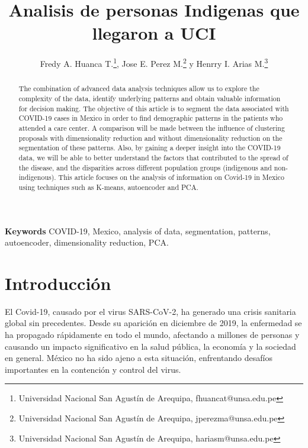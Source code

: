 \documentclass[a4paper,
               ]{jacow}
\newenvironment{keywords}
{\par\small\textbf{Keywords}}
{\par}
\begin{document}
\title{Analisis de personas Indigenas que llegaron a UCI}

\author{Fredy A. Huanca T.\thanks{Universidad Nacional San Agustín de Arequipa, fhuancat@unsa.edu.pe},
		Jose E. Perez M.\thanks{Universidad Nacional San Agustín de Arequipa, jperezma@unsa.edu.pe} y
		Henrry I. Arias M.\thanks{Universidad Nacional San Agustín de Arequipa, hariasm@unsa.edu.pe}}
	
\maketitle

%
\begin{abstract}
The combination of advanced data analysis techniques allow us to explore the complexity of the data, identify underlying patterns and obtain valuable information for decision making.
The objective of this article is to segment the data associated with COVID-19 cases in Mexico in order to find demographic patterns in the patients who attended a care center.
A comparison will be made between the influence of clustering proposals with dimensionality reduction and without dimensionality reduction on the segmentation of these patterns.
Also, by gaining a deeper insight into the COVID-19 data, we will be able to better understand the factors that contributed to the spread of the disease, and the disparities across different population groups (indigenous and non-indigenous). 
This article focuses on the analysis of information on Covid-19 in Mexico using techniques such as K-means, autoencoder and PCA.
\end{abstract}

\begin{keywords}
COVID-19, Mexico, analysis of data, segmentation, patterns, autoencoder, dimensionality reduction, PCA.
\end{keywords}

\section{Introducción}

El Covid-19, causado por el virus SARS-CoV-2, ha generado una crisis sanitaria global sin precedentes. Desde su aparición en diciembre de 2019, la enfermedad se ha propagado rápidamente en todo el mundo, afectando a millones de personas y causando un impacto significativo en la salud pública, la economía y la sociedad en general. México no ha sido ajeno a esta situación, enfrentando desafíos importantes en la contención y control del virus.
\end{document}
